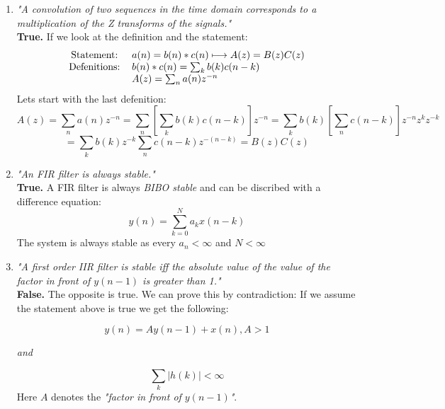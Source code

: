 \documentclass{article}
\begin{document}
\begin{enumerate}
\begin{enumerate}
            \item %
                \emph{"A convolution of two sequences in the time domain corresponds to a multiplication of the Z transforms of the signals."}
                \\
                \textbf{True.} If we look at the definition and the
                statement:
                \\
                \begin{align*}
                    \begin{tabular}{c l}
                        Statement: & $a(n) = b(n)*c(n) \longmapsto A(z) = B(z)C(z)$ \\
                        Defenitions: & $b(n)*c(n) = \sum_kb(k)c(n-k)$ \\
                         & $A(z) = \sum_na(n)z^{-n}$ \\
                    \end{tabular}
                \end{align*}
                Lets start with the last defenition:
                $$
                    A(z) = \sum_na(n)z^{-n} = \sum_n \left[ \sum_kb(k)c(n-k) \right]z^{-n}
                    = \sum_kb(k) \left[ \sum_nc(n-k) \right] z^{-n}z^{k}z^{-k} 
                $$ $$
                = \sum_kb(k)z^{-k} \sum_nc(n-k)z^{-(n-k)} = B(z) C(z)
                $$
            \item %
                \emph{"An FIR filter is always stable."}
                \\
                \textbf{True.}
                A FIR filter is always \emph{BIBO stable} and can be discribed
                with a difference equation:
                $$ 
                y(n) = \sum_{k=0}^{N} a_k x(n-k)
                $$
                The system is always stable as every 
                $a_n < \infty$ 
                and 
                $N<\infty$
                
            \item %
                \emph{"A first order IIR filter is stable iff the absolute value of the value of the factor in front of $y(n-1)$ is greater than 1."}
                \\
                \textbf{False.} The opposite is true. We can prove this by
                contradiction: If we assume the statement above is true we get
                the following:
                
                $$
                    y(n) = Ay(n-1) + x(n), A > 1
                $$
                \begin{center}
                    \textit{and}
                \end{center}
                $$
                   \sum_k |h(k)| < \infty
                $$
                Here $A$ denotes the \emph{"factor in front of $y(n-1)$"}.
                

\end{enumerate}
\end{enumerate}
\end{document}
